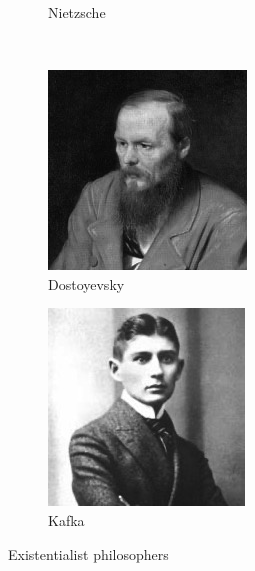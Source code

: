 \documentclass{article}
\begin{document}
\begin{figure}[!t]
\begin{subfigure}[b]{0.4\textwidth}
				\caption{Nietzsche}
			\end{subfigure}
			\\
			\begin{subfigure}[b]{0.4\textwidth}
				\includegraphics[width=\textwidth]{Dostoyevsky}
				\caption{Dostoyevsky}
			\end{subfigure}
			\begin{subfigure}[b]{0.4\textwidth}
				\includegraphics[width=\textwidth]{Kafka}
				\caption{Kafka}
			\end{subfigure}
			\caption{Existentialist philosophers}
		\end{figure}
\end{document}
